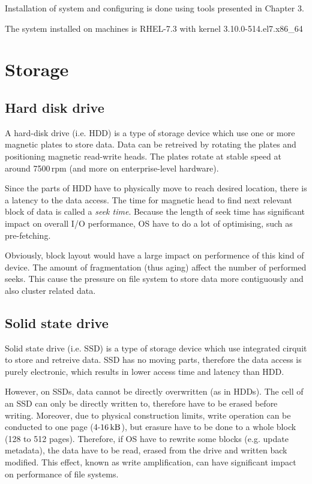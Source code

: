 \documentclass[
  color, %
  table, %
  lof,   %
  lot,   %
]{fithesis3}
\begin{document}
Installation of system and configuring is done using tools presented in Chapter 3. 

The system installed on machines is RHEL-7.3 with kernel 3.10.0-514.el7.x86\_64

\section{Storage}

\subsection{Hard disk drive}
A hard-disk drive (i.e. HDD) is a type of storage device which use one or more magnetic plates to store data. Data can be retreived by rotating the plates and positioning magnetic read-write heads. The plates rotate at stable speed at around 7500\,rpm (and more on enterprise-level hardware).

Since the parts of HDD have to physically move to reach desired location, there is a latency to the data access. The time for magnetic head to find next relevant block of data is called a \textit{seek time}. Because the length of seek time has significant impact on overall I/O performance, OS have to do a lot of optimising, such as pre-fetching.

Obviously, block layout would have a large impact on performence of this kind of device. The amount of fragmentation (thus aging) affect the number of performed seeks. This cause the pressure on file system to store data more contiguously and also cluster related data.

\subsection{Solid state drive}
Solid state drive (i.e. SSD) is  a type of storage device which use integrated cirquit to store and retreive data. SSD has no moving parts, therefore the data access is purely electronic, which results in lower access time and latency than HDD.

However, on SSDs, data cannot be directly overwritten (as in HDDs). The cell of an SSD can only be directly written to, therefore have to be erased before writing. Moreover, due to physical construction limits, write operation can be conducted to one page (4-$\SI{16}{\kilo\byte}$), but erasure have to be done to a whole block (128 to 512 pages). Therefore, if OS have to rewrite some blocks (e.g. update metadata), the data have to be read, erased from the drive and written back modified. This effect, known as write amplification, can have significant impact on performance of file systems. 
\end{document}
